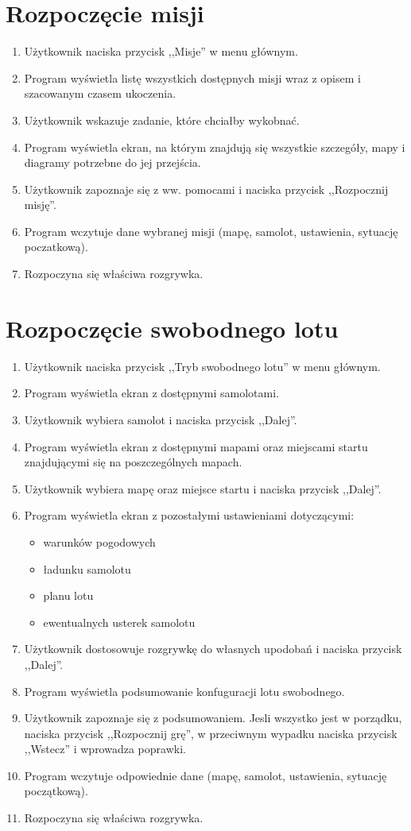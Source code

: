\documentclass{mwrep}
\begin{document}
\section{Rozpoczęcie misji}
\begin{enumerate}
  \item Użytkownik naciska przycisk ,,Misje'' w menu głównym.
  \item Program wyświetla listę wszystkich dostępnych misji wraz z opisem i szacowanym czasem ukoczenia.
  \item Użytkownik wskazuje zadanie, które chciałby wykobnać.
  \item Program wyświetla ekran, na którym znajdują się wszystkie szczegóły, mapy i diagramy potrzebne do jej przejścia.
  \item Użytkownik zapoznaje się z ww. pomocami i naciska przycisk ,,Rozpocznij misję''.
  \item Program wczytuje dane wybranej misji (mapę, samolot, ustawienia, sytuację poczatkową).
  \item Rozpoczyna się właściwa rozgrywka.
\end{enumerate}

\section{Rozpoczęcie swobodnego lotu}
\begin{enumerate}
  \item Użytkownik naciska przycisk ,,Tryb swobodnego lotu'' w menu głównym.
  \item Program wyświetla ekran z dostępnymi samolotami.
  \item Użytkownik wybiera samolot i naciska przycisk ,,Dalej''.
  \item Program wyświetla ekran z dostępnymi mapami oraz miejscami startu znajdującymi się na poszczególnych mapach.
  \item Użytkownik wybiera mapę oraz miejsce startu i naciska przycisk ,,Dalej''.
  \item Program wyświetla ekran z pozostałymi ustawieniami dotyczącymi:
  \begin{itemize}
    \item warunków pogodowych
    \item ładunku samolotu
    \item planu lotu
    \item ewentualnych usterek samolotu
  \end{itemize}
  \item Użytkownik dostosowuje rozgrywkę do własnych upodobań i naciska przycisk ,,Dalej''.
  \item Program wyświetla podsumowanie konfuguracji lotu swobodnego.
  \item Użytkownik zapoznaje się z podsumowaniem. Jesli wszystko jest w porządku, naciska przycisk ,,Rozpocznij grę'', w przeciwnym wypadku naciska przycisk ,,Wstecz'' i wprowadza poprawki.
  \item Program wczytuje odpowiednie dane (mapę, samolot, ustawienia, sytuację początkową).
  \item Rozpoczyna się właściwa rozgrywka.
\end{enumerate}
\end{document}

